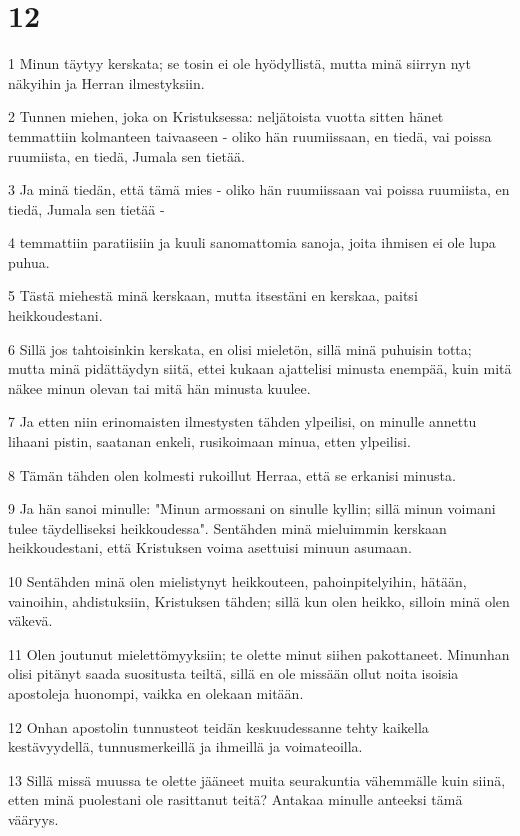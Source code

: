 \chapter{12}

\par 1 Minun täytyy kerskata; se tosin ei ole hyödyllistä, mutta minä siirryn nyt näkyihin ja Herran ilmestyksiin.
\par 2 Tunnen miehen, joka on Kristuksessa: neljätoista vuotta sitten hänet temmattiin kolmanteen taivaaseen - oliko hän ruumiissaan, en tiedä, vai poissa ruumiista, en tiedä, Jumala sen tietää.
\par 3 Ja minä tiedän, että tämä mies - oliko hän ruumiissaan vai poissa ruumiista, en tiedä, Jumala sen tietää -
\par 4 temmattiin paratiisiin ja kuuli sanomattomia sanoja, joita ihmisen ei ole lupa puhua.
\par 5 Tästä miehestä minä kerskaan, mutta itsestäni en kerskaa, paitsi heikkoudestani.
\par 6 Sillä jos tahtoisinkin kerskata, en olisi mieletön, sillä minä puhuisin totta; mutta minä pidättäydyn siitä, ettei kukaan ajattelisi minusta enempää, kuin mitä näkee minun olevan tai mitä hän minusta kuulee.
\par 7 Ja etten niin erinomaisten ilmestysten tähden ylpeilisi, on minulle annettu lihaani pistin, saatanan enkeli, rusikoimaan minua, etten ylpeilisi.
\par 8 Tämän tähden olen kolmesti rukoillut Herraa, että se erkanisi minusta.
\par 9 Ja hän sanoi minulle: "Minun armossani on sinulle kyllin; sillä minun voimani tulee täydelliseksi heikkoudessa". Sentähden minä mieluimmin kerskaan heikkoudestani, että Kristuksen voima asettuisi minuun asumaan.
\par 10 Sentähden minä olen mielistynyt heikkouteen, pahoinpitelyihin, hätään, vainoihin, ahdistuksiin, Kristuksen tähden; sillä kun olen heikko, silloin minä olen väkevä.
\par 11 Olen joutunut mielettömyyksiin; te olette minut siihen pakottaneet. Minunhan olisi pitänyt saada suositusta teiltä, sillä en ole missään ollut noita isoisia apostoleja huonompi, vaikka en olekaan mitään.
\par 12 Onhan apostolin tunnusteot teidän keskuudessanne tehty kaikella kestävyydellä, tunnusmerkeillä ja ihmeillä ja voimateoilla.
\par 13 Sillä missä muussa te olette jääneet muita seurakuntia vähemmälle kuin siinä, etten minä puolestani ole rasittanut teitä? Antakaa minulle anteeksi tämä vääryys.
